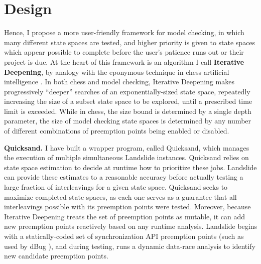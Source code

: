 
\section{Design}

Hence, I propose a more user-friendly framework for model checking, in which many different state spaces are tested,
and higher priority is given to state spaces which appear possible to complete before the user's patience runs out or their project is due.
At the heart of this framework is an algorithm I call {\bf Iterative Deepening},
by analogy with the eponymous technique in chess artificial intelligence \cite{iterative-deepening-chess-ai}.
In both chess and model checking, Iterative Deepening makes progressively ``deeper'' searches of an exponentially-sized state space,
repeatedly increasing the size of a subset state space to be explored,
until a prescribed time limit is exceeded.
While in chess, the size bound is determined by a single depth parameter,
the size of model checking state spaces is determined by any number of different combinations of preemption points being enabled or disabled.

{\bf Quicksand.}
I have built a wrapper program, called Quicksand, which manages the execution of multiple simultaneous Landslide instances.
Quicksand relies on state space estimation \cite{estimation} to decide at runtime how to prioritize these jobs.
Landslide can provide these estimates to a reasonable accuracy before actually testing a large fraction of interleavings for a given state space.
Quicksand seeks to maximize completed state spaces,
as each one serves as a guarantee that all interleavings possible with its preemption points were tested.
Moreover, because Iterative Deepening treats the set of preemption points as mutable,
it can add new preemption points reactively based on any runtime analysis.
Landslide begins with a statically-coded set of synchronization API preemption points (such as used by dBug \cite{dbug-ssv}),
and during testing, runs a dynamic data-race analysis \cite{hybriddatarace,tsan,ifrit} to identify new candidate preemption points.

\newcommand\PendingJobs{\ensuremath{\mathcal{P}}}
\newcommand\SuspendedJobs{\ensuremath{\mathcal{S}}}
\newcommand\GetETA[1]{ETA(#1)}
\newcommand\GetPPSet[1]{PPSet(#1)}

